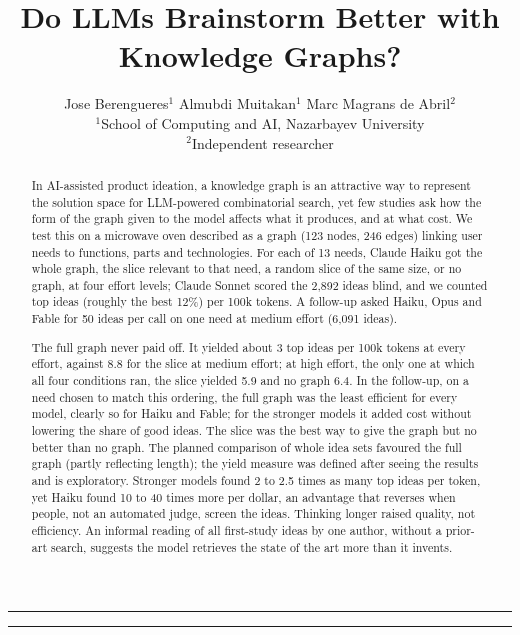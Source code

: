 \documentclass[11pt,a4paper]{article}
\title{Do LLMs Brainstorm Better with Knowledge Graphs?}
\author{Jose Berengueres$^{1}$ \quad
        Almubdi Muitakan$^{1}$\quad 
        Marc Magrans de Abril$^{2}$ \\[0.6em]
{\small 
        $^{1}$School of Computing and AI, Nazarbayev University\\
        $^{2}$Independent researcher
       }}
\date{}
\makeatletter
\renewcommand{\maketitle}{%
  \begingroup\renewcommand{\thefootnote}{\fnsymbol{footnote}}%
  \begin{center}
    \rule{\linewidth}{4pt}\par\vspace{0.35in}
    {\LARGE\bfseries \@title\par}
    \vspace{0.25in}\rule{\linewidth}{1pt}\par\vspace{0.3in}
    {\normalsize \@author\par}
    \vspace{0.3in}
  \end{center}
  \thispagestyle{plain}\@thanks\endgroup
  \setcounter{footnote}{0}\global\let\@thanks\@empty}
\makeatother
\begin{document}
\maketitle
{\let\thefootnote\relax{}}
\begin{abstract}

In AI-assisted product ideation, a knowledge graph is an attractive way to represent the solution space for LLM-powered combinatorial search, yet few studies ask how the form of the graph given to the model affects what it produces, and at what cost. We test this on a microwave oven described as a graph (123 nodes, 246 edges) linking user needs to functions, parts and technologies. For each of 13 needs, Claude Haiku got the whole graph, the slice relevant to that need, a random slice of the same size, or no graph, at four effort levels; Claude Sonnet scored the 2,892 ideas blind, and we counted top ideas (roughly the best 12\%) per 100k tokens. A follow-up asked Haiku, Opus and Fable for 50 ideas per call on one need at medium effort (6,091 ideas).

The full graph never paid off. It yielded about 3 top ideas per 100k tokens at every effort, against 8.8 for the slice at medium effort; at high effort, the only one at which all four conditions ran, the slice yielded 5.9 and no graph 6.4. In the follow-up, on a need chosen to match this ordering, the full graph was the least efficient for every model, clearly so for Haiku and Fable; for the stronger models it added cost without lowering the share of good ideas. The slice was the best way to give the graph but no better than no graph. The planned comparison of whole idea sets favoured the full graph (partly reflecting length); the yield measure was defined after seeing the results and is exploratory. Stronger models found 2 to 2.5 times as many top ideas per token, yet Haiku found 10 to 40 times more per dollar, an advantage that reverses when people, not an automated judge, screen the ideas. Thinking longer raised quality, not efficiency. An informal reading of all first-study ideas by one author, without a prior-art search, suggests the model retrieves the state of the art more than it invents.

\end{abstract}






\clearpage
\appendix

\end{document}
